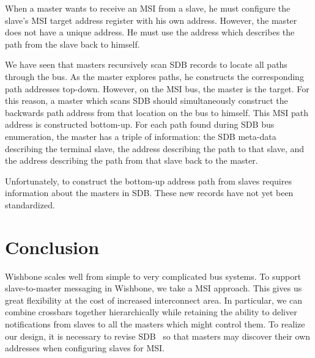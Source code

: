 \documentclass[a4paper]{jacow}
\begin{document}
When a master wants to receive an MSI from a slave, 
he must configure the slave's MSI target address register with his own address.
However, the master does not have a unique address.
He must use the address which describes the path from the slave back to himself.

We have seen that masters recursively scan SDB records to locate all paths
through the bus.
As the master explores paths, he constructs the corresponding path addresses top-down.
However, on the MSI bus, the master is the target.
For this reason, a master which scans SDB should simultaneously construct
the backwards path address from that location on the bus to himself.
This MSI path address is constructed bottom-up.
For each path found during SDB bus enumeration,
the master has a triple of information:
the SDB meta-data describing the terminal slave,
the address describing the path to that slave,
and the address describing the path from that slave back to the master.

Unfortunately,
to construct the bottom-up address path from slaves requires information
about the masters in SDB.
These new records have not yet been standardized.

\section{Conclusion}

Wishbone scales well from simple to very complicated bus systems.
To support slave-to-master messaging in Wishbone, we take a MSI approach.
This gives us great flexibility at the cost of increased interconnect area.
In particular, we can combine crossbars together hierarchically 
while retaining the ability to 
deliver notifications from slaves to all the masters which might control them.
To realize our design,
it is necessary to revise SDB~\cite{sdb} so that masters may
discover their own addresses when configuring slaves for MSI.



\end{document}
